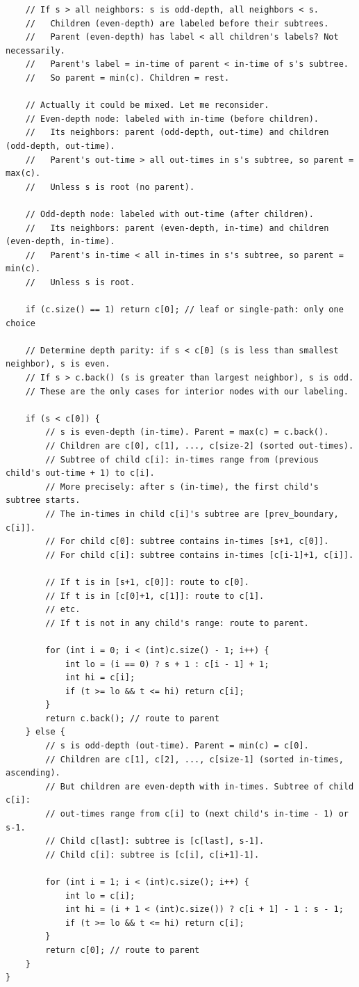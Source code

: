 \documentclass[11pt,a4paper]{article}
\begin{document}
\begin{lstlisting}
    // If s > all neighbors: s is odd-depth, all neighbors < s.
    //   Children (even-depth) are labeled before their subtrees.
    //   Parent (even-depth) has label < all children's labels? Not necessarily.
    //   Parent's label = in-time of parent < in-time of s's subtree.
    //   So parent = min(c). Children = rest.

    // Actually it could be mixed. Let me reconsider.
    // Even-depth node: labeled with in-time (before children).
    //   Its neighbors: parent (odd-depth, out-time) and children (odd-depth, out-time).
    //   Parent's out-time > all out-times in s's subtree, so parent = max(c).
    //   Unless s is root (no parent).

    // Odd-depth node: labeled with out-time (after children).
    //   Its neighbors: parent (even-depth, in-time) and children (even-depth, in-time).
    //   Parent's in-time < all in-times in s's subtree, so parent = min(c).
    //   Unless s is root.

    if (c.size() == 1) return c[0]; // leaf or single-path: only one choice

    // Determine depth parity: if s < c[0] (s is less than smallest neighbor), s is even.
    // If s > c.back() (s is greater than largest neighbor), s is odd.
    // These are the only cases for interior nodes with our labeling.

    if (s < c[0]) {
        // s is even-depth (in-time). Parent = max(c) = c.back().
        // Children are c[0], c[1], ..., c[size-2] (sorted out-times).
        // Subtree of child c[i]: in-times range from (previous child's out-time + 1) to c[i].
        // More precisely: after s (in-time), the first child's subtree starts.
        // The in-times in child c[i]'s subtree are [prev_boundary, c[i]].
        // For child c[0]: subtree contains in-times [s+1, c[0]].
        // For child c[i]: subtree contains in-times [c[i-1]+1, c[i]].

        // If t is in [s+1, c[0]]: route to c[0].
        // If t is in [c[0]+1, c[1]]: route to c[1].
        // etc.
        // If t is not in any child's range: route to parent.

        for (int i = 0; i < (int)c.size() - 1; i++) {
            int lo = (i == 0) ? s + 1 : c[i - 1] + 1;
            int hi = c[i];
            if (t >= lo && t <= hi) return c[i];
        }
        return c.back(); // route to parent
    } else {
        // s is odd-depth (out-time). Parent = min(c) = c[0].
        // Children are c[1], c[2], ..., c[size-1] (sorted in-times, ascending).
        // But children are even-depth with in-times. Subtree of child c[i]:
        // out-times range from c[i] to (next child's in-time - 1) or s-1.
        // Child c[last]: subtree is [c[last], s-1].
        // Child c[i]: subtree is [c[i], c[i+1]-1].

        for (int i = 1; i < (int)c.size(); i++) {
            int lo = c[i];
            int hi = (i + 1 < (int)c.size()) ? c[i + 1] - 1 : s - 1;
            if (t >= lo && t <= hi) return c[i];
        }
        return c[0]; // route to parent
    }
}
\end{lstlisting}
\end{document}
